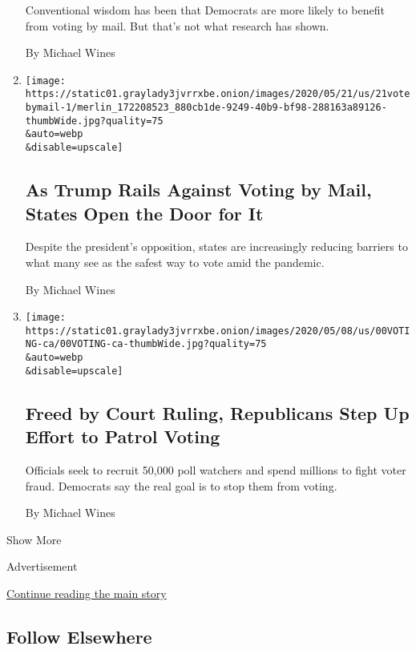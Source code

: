 \begin{enumerate}
  Conventional wisdom has been that Democrats are more likely to benefit
  from voting by mail. But that's not what research has shown.

  By Michael Wines
\item
  \href{/2020/05/21/us/vote-by-mail-trump.html}{}

  \texttt{[image: https://static01.graylady3jvrrxbe.onion/images/2020/05/21/us/21votebymail-1/merlin\_172208523\_880cb1de-9249-40b9-bf98-288163a89126-thumbWide.jpg?quality=75\\\&auto=webp\\\&disable=upscale]}

  \hypertarget{as-trump-rails-against-voting-by-mail-states-open-the-door-for-it}{%
  \subsection{As Trump Rails Against Voting by Mail, States Open the
  Door for
  It}\label{as-trump-rails-against-voting-by-mail-states-open-the-door-for-it}}

  Despite the president's opposition, states are increasingly reducing
  barriers to what many see as the safest way to vote amid the pandemic.

  By Michael Wines
\item
  \href{/2020/05/18/us/Voting-republicans-trump.html}{}

  \texttt{[image: https://static01.graylady3jvrrxbe.onion/images/2020/05/08/us/00VOTING-ca/00VOTING-ca-thumbWide.jpg?quality=75\\\&auto=webp\\\&disable=upscale]}

  \hypertarget{freed-by-court-ruling-republicans-step-up-effort-to-patrol-voting}{%
  \subsection{Freed by Court Ruling, Republicans Step Up Effort to
  Patrol
  Voting}\label{freed-by-court-ruling-republicans-step-up-effort-to-patrol-voting}}

  Officials seek to recruit 50,000 poll watchers and spend millions to
  fight voter fraud. Democrats say the real goal is to stop them from
  voting.

  By Michael Wines
\end{enumerate}

Show More

Advertisement

\protect\hyperlink{after-mid2}{Continue reading the main story}

\hypertarget{follow-elsewhere}{%
\subsection{Follow Elsewhere}\label{follow-elsewhere}}

